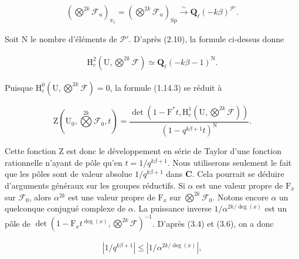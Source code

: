 \documentclass[10pt,leqno]{article}
\begin{document}
\begin{equation*}\begin{gathered}(\bigotimes\limits^{2k}\mathcal{F} _{u})_{\pi _{1}} = (\bigotimes\limits^{2k}\mathcal{F} _{u})_{\operatorname{Sp}} \xrightarrow{\sim } \mathbf{Q}_{\ell }(- k\beta )^{\mathcal{P} '}.\end{gathered}\end{equation*}

\noindent Soit \(\mathrm{N}\) le nombre d’éléments de \(\mathcal{P} '\). D’après (2.10), la formule ci-dessus donne\par

\begin{equation*}\begin{gathered}\mathrm{H}_{c}^{2}(\mathrm{U},\bigotimes\limits^{2k}\mathcal{F} ) \simeq  \mathbf{Q}_{\ell }(- k\beta - 1)^{\mathrm{N}}.\end{gathered}\end{equation*}

\noindent Puisque \(\mathrm{H}_{c}^{0}(\mathrm{U},\bigotimes\limits^{2k}\mathcal{F} )=0\), la formule (1.14.3) se réduit à\par

\[\mathrm{Z}(\mathrm{U}_{0},\bigotimes\limits^{2k}\mathcal{F} _{0},t)=\frac{\operatorname{det}(1- \mathrm{F}^{*}t,\mathrm{H}_{c}^{1}(\mathrm{U},\bigotimes\limits^{2k}\mathcal{F} ))}{(1- q^{k\beta +1}t)^{\mathrm{N}}}.\]

\noindent Cette fonction \(\mathrm{Z}\) est donc le développement en série de Taylor d’une fonction rationnelle n’ayant de pôle qu’en \(t=1/q^{k\beta +1}\). Nous utiliserons seulement le fait que les pôles sont de valeur absolue \(1/q^{k\beta +1}\) dans \(\mathbf{C}\). Cela pourrait se déduire d’arguments généraux sur les groupes réductifs. Si \(\alpha \) est une valeur propre de \(\mathrm{F}_{x}\) sur \(\mathcal{F} _{0}\), alors \(\alpha ^{2k}\) est une valeur propre de \(\mathrm{F}_{x}\) sur \(\bigotimes\limits^{2k}\mathcal{F} _{0}\). Notons encore \(\alpha \) un quelconque conjugué complexe de \(\alpha \). La puissance inverse \(1/\alpha ^{2k/\operatorname{deg}(x)}\) est un pôle de \(\operatorname{det}(1- \mathrm{F}_{x} t^{\operatorname{deg}(x)},\bigotimes\limits^{2k}\mathcal{F} )^{- 1}\). D’après (3.4) et (3.6), on a donc\par

\begin{equation*}\begin{gathered}|1/q^{k\beta +1}| \leq  |1/\alpha ^{2k/\operatorname{deg}(x)}|,\end{gathered}\end{equation*}
\end{document}
